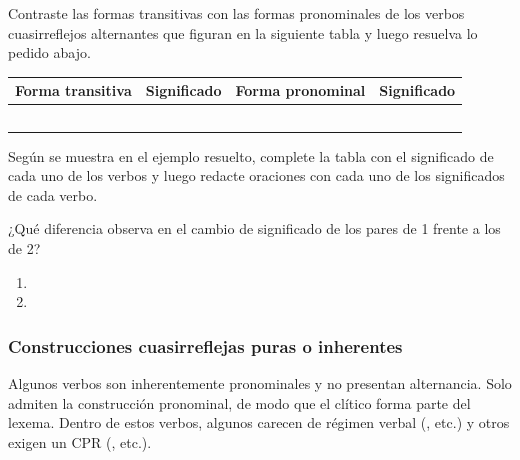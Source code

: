 \begin{ejercicio}\label{ej:10-alternantes}
Contraste las formas transitivas con las formas pronominales de los verbos
cuasirreflejos alternantes que figuran en la siguiente tabla y luego resuelva lo
pedido abajo.

{\small
\begin{tabularx}{\linewidth}{@{}l L l L@{}}
  \toprule
  Forma transitiva & Significado & Forma pronominal & Significado \\
  \midrule
      &  &  &
     \\
       & &  & \\
       & &  & \\
   & &  & \\
      & &  & \\
  \bottomrule
\end{tabularx}}

\begin{consignas}
  \item Según se muestra en el ejemplo resuelto, complete la tabla con el
        significado de cada uno de los verbos y luego redacte oraciones con cada
        uno de los significados de cada verbo.
  \item ¿Qué diferencia observa en el cambio de significado de los pares de 1
        frente a los de 2?
        \begin{enumerate}[label=\arabic*.]
          \item {}
          \item {}
        \end{enumerate}
\end{consignas}
\end{ejercicio}

\subsubsection{Construcciones cuasirreflejas puras o inherentes}\label{sec:10-inherentes}

Algunos verbos son inherentemente pronominales y no presentan alternancia. Solo
admiten la construcción pronominal, de modo que el clítico  forma
parte del lexema. Dentro de estos verbos, algunos carecen de régimen verbal
(, etc.) y otros exigen un CPR (,
etc.).


